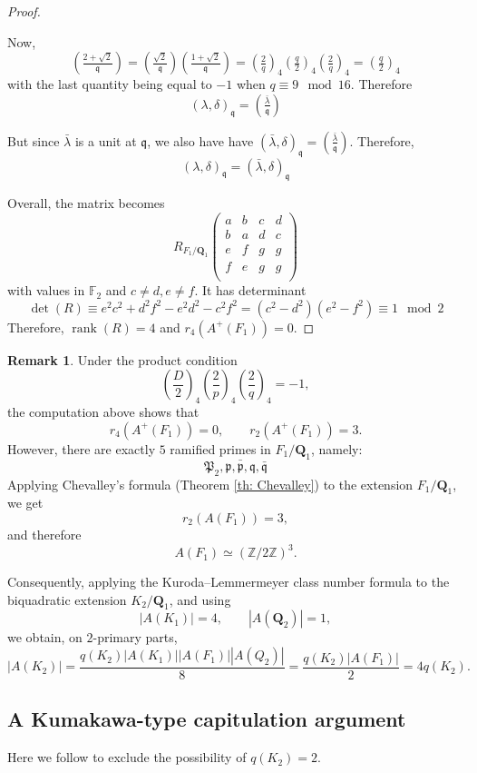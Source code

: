 \documentclass{article}
\numberwithin{equation}{section}
\theoremstyle{plain}  %
\theoremstyle{definition}
\newtheorem{remark}{Remark}[section]
\newcommand{\Z}{\mathbb{Z}}
\newcommand{\F}{\mathbb{F}}
\newcommand{\kron}[2]{\left( \tfrac{#1}{#2} \right)}
\DeclareMathOperator{\rank}{rank}
\newcommand{\fk}{\mathfrak }
\begin{document}
\begin{proof}
\begin{itemize}
Now, $$\kron{2+\sqrt{2}}{\fk q}= \kron{\sqrt{2}}{\fk q} \kron{1+\sqrt{2}}{\fk q} = \kron{2}{q}_4 \kron{q}{2}_4 \kron{2}{q}_4 = \kron{q}{2}_4 $$ 
with the last quantity being equal to $-1$ when $q \equiv 9 \mod 16$. Therefore $$(\lambda,\delta)_{\fk q} = \kron{\bar \lambda}{\fk q}$$

But since $\bar \lambda $ is a unit at $\fk q$, we also have have $(\bar \lambda, \delta)_{\fk q} = \kron{\bar \lambda}{\fk q}$. Therefore, $$(\lambda,\delta)_\fk q=(\bar\lambda,\delta)_\fk q$$


\end{itemize}
Overall, the matrix becomes 
$$ R_{F_1/\mathbf Q_1}\begin{pmatrix}
    a & b & c & d \\
    b & a & d & c \\
    e & f & g & g \\
    f & e & g & g \\
\end{pmatrix}
$$
with values in $\F_2$ and $c\neq d, e\neq f$. It has determinant $$\det(R)\equiv e^2c^2 +d^2 f^2 -e^2d^2-c^2f^2 = (c^2-d^2)(e^2-f^2) \equiv 1 \mod 2$$ 
Therefore, $\rank(R)=4$ and $r_4(A^+(F_1))=0$.


\end{proof}


\begin{remark}\label{rem:F1-upper-bound}
Under the product condition
$$
\left(\frac{D}{2}\right)_4
\left(\frac{2}{p}\right)_4
\left(\frac{2}{q}\right)_4=-1,
$$
the computation above shows that
$$
r_4(A^+(F_1))=0,\qquad r_2(A^+(F_1))=3.
$$
However, there are exactly $5$ ramified primes in $F_1/\mathbf Q_1$, namely: $$\fk P_2, \fk p, \bar{ \fk p}, \fk q, \bar{ \fk q}$$ Applying Chevalley's formula (Theorem \ref{th: Chevalley}) to the extension $F_1/\mathbf Q_1$, we get $$r_2(A(F_1))=3,$$ and therefore $$A(F_1)\simeq (\Z/2\Z)^3.$$

Consequently, applying the Kuroda--Lemmermeyer class number formula to
the biquadratic extension $K_2/\mathbf Q_1$, and using
$$
|A(K_1)|=4,\qquad |A(\mathbf Q_2)|=1,
$$
we obtain, on $2$-primary parts,
$$
|A(K_2)|
=
\frac{q(K_2)|A(K_1)||A(F_1)||A(Q_2)|}{8}
=
\frac{q(K_2)|A(F_1)|}{2}
=
4q(K_2).
$$
\end{remark}


\subsection{A Kumakawa-type capitulation argument}
Here we follow \cite{MR4262274} to exclude the possibility of $q(K_2)=2$. 
\end{document}
